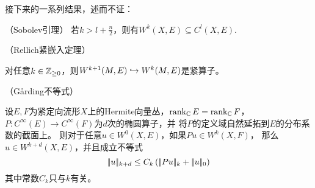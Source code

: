 
接下来的一系列结果，述而不证：

\begin{lemma}（Sobolev引理）
若$k>l+\frac{n}{2}$，则有$W^k(X,E)\subseteq C^l(X,E)$.
\end{lemma}

\begin{lemma}（Rellich紧嵌入定理）

对任意$k\in\mathbb{Z}_{\geq 0}$，则$W^{k+1}(M,E)\hookrightarrow W^k(M,E)$是紧算子。
\end{lemma}


\begin{lemma}（G{\aa}rding不等式）

设$E,F$为紧定向流形$X$上的Hermite向量丛，$\operatorname{rank}_{\mathbb{C}}E=\operatorname{rank}_{\mathbb{C}}F$，
$P:C^\infty(E)\to C^\infty(F)$为$d$次的椭圆算子，并
将$P$的定义域自然延拓到$E$的分布系数的截面上。
则对于任意$u\in W^0(X,E)$，如果$Pu\in W^k(X,F)$，
那么$u\in W^{k+d}(X,E)$，并且成立不等式
$$
  |\!|u|\!|_{k+d}
\leq
  C_k\left(
    |\!|Pu|\!|_k
   +|\!|u|\!|_0
  \right)
$$
其中常数$C_k$只与$k$有关。
\end{lemma}


